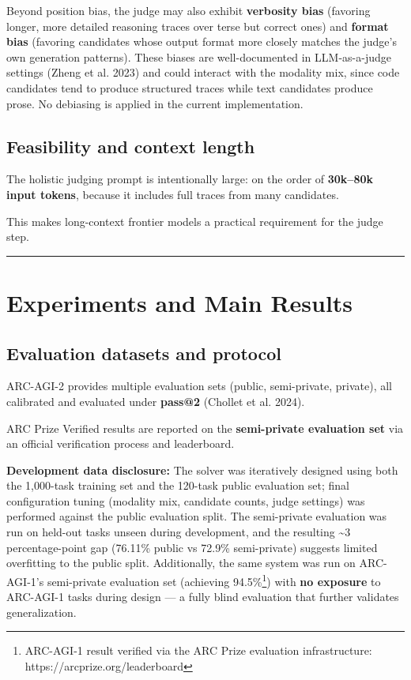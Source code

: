 \documentclass[11pt]{article}
\begin{document}
Beyond position bias, the judge may also exhibit \textbf{verbosity bias}
(favoring longer, more detailed reasoning traces over terse but correct
ones) and \textbf{format bias} (favoring candidates whose output format
more closely matches the judge's own generation patterns). These biases
are well-documented in LLM-as-a-judge settings (Zheng et al. 2023) and
could interact with the modality mix, since code candidates tend to
produce structured traces while text candidates produce prose. No
debiasing is applied in the current implementation.

\hypertarget{feasibility-and-context-length}{%
\subsection{Feasibility and context
length}\label{feasibility-and-context-length}}

The holistic judging prompt is intentionally large: on the order of
\textbf{30k--80k input tokens}, because it includes full traces from
many candidates.

This makes long-context frontier models a practical requirement for the
judge step.

\begin{center}\rule{0.5\linewidth}{0.5pt}\end{center}

\hypertarget{experiments-and-main-results}{%
\section{Experiments and Main
Results}\label{experiments-and-main-results}}

\hypertarget{evaluation-datasets-and-protocol}{%
\subsection{Evaluation datasets and
protocol}\label{evaluation-datasets-and-protocol}}

ARC-AGI-2 provides multiple evaluation sets (public, semi-private,
private), all calibrated and evaluated under \textbf{pass@2} (Chollet et
al. 2024).

ARC Prize Verified results are reported on the \textbf{semi-private
evaluation set} via an official verification process and leaderboard.

\textbf{Development data disclosure:} The solver was iteratively
designed using both the 1,000-task training set and the 120-task public
evaluation set; final configuration tuning (modality mix, candidate
counts, judge settings) was performed against the public evaluation
split. The semi-private evaluation was run on held-out tasks unseen
during development, and the resulting \textasciitilde3 percentage-point
gap (76.11\% public vs 72.9\% semi-private) suggests limited overfitting
to the public split. Additionally, the same system was run on
ARC-AGI-1's semi-private evaluation set (achieving 94.5\%\footnote{ARC-AGI-1
  result verified via the ARC Prize evaluation infrastructure:
  https://arcprize.org/leaderboard}) with \textbf{no exposure} to
ARC-AGI-1 tasks during design --- a fully blind evaluation that further
validates generalization.
\end{document}
